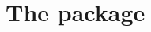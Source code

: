 \documentclass[showtrims, letterpaper]{memoir}
\begin{document}
\part{The  package}
\label{chap:tcltk}



% 


\backmatter
\appendix





\printindex
\end{document}
